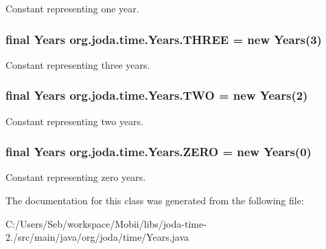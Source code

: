 Constant representing one year. \hypertarget{classorg_1_1joda_1_1time_1_1_years_a01da574c01c789fc4b7871a806caf1aa}{
\subsubsection[{T\-H\-R\-E\-E}]{\setlength{\rightskip}{0pt plus 5cm}final {\bf Years} org.\-joda.\-time.\-Years.\-T\-H\-R\-E\-E = new {\bf Years}(3)\hspace{0.3cm}{\ttfamily [static]}}}\label{classorg_1_1joda_1_1time_1_1_years_a01da574c01c789fc4b7871a806caf1aa}
Constant representing three years. \hypertarget{classorg_1_1joda_1_1time_1_1_years_acd8b511971f16e1345d7c00e40a430c6}{
\subsubsection[{T\-W\-O}]{\setlength{\rightskip}{0pt plus 5cm}final {\bf Years} org.\-joda.\-time.\-Years.\-T\-W\-O = new {\bf Years}(2)\hspace{0.3cm}{\ttfamily [static]}}}\label{classorg_1_1joda_1_1time_1_1_years_acd8b511971f16e1345d7c00e40a430c6}
Constant representing two years. \hypertarget{classorg_1_1joda_1_1time_1_1_years_a3ca3e82fc0587ef2e37762844727a140}{
\subsubsection[{Z\-E\-R\-O}]{\setlength{\rightskip}{0pt plus 5cm}final {\bf Years} org.\-joda.\-time.\-Years.\-Z\-E\-R\-O = new {\bf Years}(0)\hspace{0.3cm}{\ttfamily [static]}}}\label{classorg_1_1joda_1_1time_1_1_years_a3ca3e82fc0587ef2e37762844727a140}
Constant representing zero years. 

The documentation for this class was generated from the following file\-:\begin{DoxyCompactItemize}
\item 
C\-:/\-Users/\-Seb/workspace/\-Mobii/libs/joda-\/time-\/2./src/main/java/org/joda/time/Years.\-java\end{DoxyCompactItemize}
